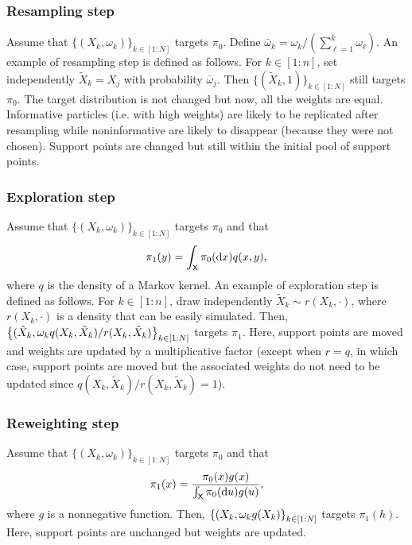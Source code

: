\documentclass[english,graybox,envcountchap,envcountsame,sectrefs,shortlabels]{svmono}
\theoremstyle{style}
\newcommand{\eqsp}{}
\begin{document}
\subsubsection{Resampling step}
Assume that $\{(X_k,\omega_k)\}_{k\in[1:N]}$ targets $\pi_0$. Define $\bar \omega_k=\omega_k/(\sum_{\ell=1}^{k} \omega_\ell)$. An example of resampling step is defined as follows. For $k\in[1:n]$, set independently $\tilde X_k = X_j$ with probability $\bar \omega_j$. 
Then $\{(\tilde X_k,1)\}_{k\in[1:N]}$ still targets $\pi_0$. The target distribution is not changed but now, all the weights are equal. Informative particles (i.e. with high weights) are likely to be replicated after resampling while noninformative are likely to disappear (because they were not chosen). Support points are changed but still within the initial pool of support points.

\subsubsection{Exploration step}
Assume that $\{(X_k,\omega_k)\}_{k\in[1:N]}$ targets $\pi_0$ and that
\begin{equation} \label{eq:explor}
\pi_1(y)=\int_\Xset \pi_0(\rmd x) q(x,y)\eqsp,
\end{equation}
where $q$ is the density of a Markov kernel. An example of exploration step is defined as follows. For $k\in[1:n]$, draw independently $\tilde X_k\sim r(X_k,\cdot)$, 
where $r(X_k,\cdot)$ is a density that can be easily simulated.
Then, $\left\{ (\tilde X_k,\omega_k q(X_k,\tilde X_k)/r(X_k,\tilde X_k)\right\}_{k\in[1:N]}$ targets $\pi_1$.
Here, support points are moved and weights are updated by a multiplicative factor (except when $r=q$, in which case, support points are moved but the associated weights do not need to be updated  since $ q(X_k,\tilde X_k)/r(X_k,\tilde X_k)=1$).
\subsubsection{Reweighting step}
Assume that $\{(X_k,\omega_k)\}_{k\in[1:N]}$ targets $\pi_0$ and that
\begin{equation} \label{eq:resamp}
\pi_1(x)=\frac{ \pi_0(x) g(x) }{\int_{\mathsf{X}} \pi_0(\mathrm{d} u) g(u) },
\end{equation}
where $g$ is a nonnegative function. Then,  $\left\{ (X_k,\omega_k g(X_k) \right\}_{k\in[1:N]}$ targets $\pi_1(h)$. Here, support points are unchanged but weights are updated.
\end{document}

